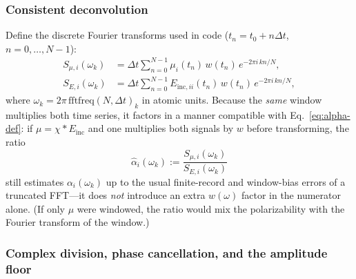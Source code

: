 \documentclass[11pt,a4paper]{article}
\begin{document}
\subsubsection{Consistent deconvolution}

Define the discrete Fourier transforms used in code
($t_n = t_0 + n\Delta t$, $n=0,\ldots,N-1$):
\begin{align}
  S_{\mu,i}(\omega_k)
  &=
  \Delta t
  \sum_{n=0}^{N-1}
  \mu_i(t_n)\, w(t_n)\,
  e^{-2\pi i\, kn/N},
  \label{eq:Smu} \\
  S_{E,i}(\omega_k)
  &=
  \Delta t
  \sum_{n=0}^{N-1}
  E_{\mathrm{inc},ii}(t_n)\, w(t_n)\,
  e^{-2\pi i\, kn/N},
  \label{eq:SE}
\end{align}
where $\omega_k = 2\pi\, \mathrm{fftfreq}(N,\Delta t)_k$ in atomic units.
Because the \emph{same} window multiplies both time series, it factors in
a manner compatible with Eq.~\eqref{eq:alpha-def}: if
$\mu = \chi * E_{\mathrm{inc}}$ and one multiplies both signals by $w$
before transforming, the ratio
\begin{equation}
  \hat\alpha_i(\omega_k)
  :=
  \frac{S_{\mu,i}(\omega_k)}{S_{E,i}(\omega_k)}
  \label{eq:alpha-hat}
\end{equation}
still estimates $\alpha_i(\omega_k)$ up to the usual finite-record and
window-bias errors of a truncated FFT---it does \emph{not} introduce an
extra $w(\omega)$ factor in the numerator alone.  (If only $\mu$ were
windowed, the ratio would mix the polarizability with the Fourier
transform of the window.)

\subsubsection{Complex division, phase cancellation, and the amplitude floor}
\end{document}
